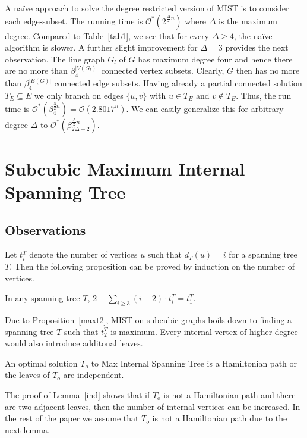 \documentclass{llncs}
\newcommand{\longversion}[1]{#1}
\newcommand{\shortversion}[1]{}
\newcommand{\mc}{\mathcal}
\newcommand{\Oh}{{\mc{O}}}
\newcommand{\mist}{\textsc{MIST}\xspace}
\begin{document}
A na{\"i}ve approach to solve the degree restricted version of MIST is to consider each edge-subset. The running time is $\Oh^*(2^{\frac{\Delta}{2}n})$ where $\Delta$ is the maximum degree.
Compared to Table~\ref{tab1}, \longversion{we see that }for every $\Delta \ge 4$, the na{\"i}ve algorithm is slower. A further slight improvement for
$\Delta=3$ provides the next observation. The line graph $G_l$ of $G$ has maximum degree four and hence there are no more than $\beta_4^{|V(G_l)|}$
connected vertex subsets. Clearly, $G$ then has no more than $\beta_4^{|E(G)|}$ connected edge subsets. Having already a partial connected solution
$T_E \subseteq E$ we only branch on edges $\{u,v\}$ with $u \in T_E$ and $v \not \in T_E$. 
Thus, the run time is $\Oh^*(\beta_4^{\frac{3}{2}n}) = \Oh(2.8017^n)$. We can easily generalize this for arbitrary degree $\Delta$ to
$\Oh^*(\beta_{2\Delta-2}^{\frac{\Delta}{2}n})$.

\section{Subcubic Maximum Internal Spanning Tree}
\subsection{Observations}
Let $t^T_i$ denote the number of vertices $u$ such that $d_T(u)=i$ for a spanning tree $T$. Then the following proposition can be proved
by induction on the number of vertices.
\begin{proposition}\label{maxt2}
In any spanning tree $T$, $2+\sum_{i \ge 3}(i-2)\cdot t_i^T=t_1^T$.
\end{proposition}
Due to Proposition~\ref{maxt2}, \mist on subcubic graphs boils down to finding a spanning tree $T$ such that $t_2^T$ is maximum. Every internal vertex
of higher degree would also introduce additonal leaves.
\begin{lemma}{\cite{PriSlo2003}}\label{ind} An optimal solution
 $T_o$ to {\sc Max Internal Spanning Tree} is a Hamiltonian path or the leaves of $T_o$ are independent.
\end{lemma}
The proof of Lemma~\ref{ind} shows that if $T_o$ is not a Hamiltonian path and there are two adjacent leaves, then the number of internal vertices can be increased.
In the rest of the paper we assume that $T_o$ is not a Hamiltonian path due to the next lemma. 

\shortversion{Using the $\Oh^*(1.251^n)$ algorithm for \textsc{Hamiltonian Cycle} \cite{IwaNak07} we can easily prove the following.}
\end{document}
